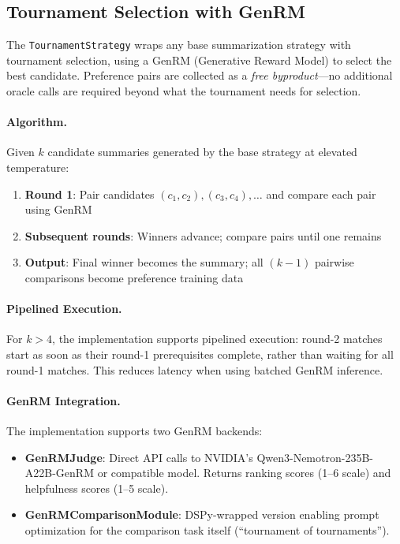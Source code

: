 
\subsection{Tournament Selection with GenRM}\label{sec:tournament-genrm}

The \texttt{TournamentStrategy} wraps any base summarization strategy with tournament selection, using a GenRM (Generative Reward Model) to select the best candidate. Preference pairs are collected as a \emph{free byproduct}---no additional oracle calls are required beyond what the tournament needs for selection.

\paragraph{Algorithm.}
Given $k$ candidate summaries generated by the base strategy at elevated temperature:

\begin{enumerate}[nosep]
    \item \textbf{Round 1}: Pair candidates $(c_1, c_2), (c_3, c_4), \ldots$ and compare each pair using GenRM
    \item \textbf{Subsequent rounds}: Winners advance; compare pairs until one remains
    \item \textbf{Output}: Final winner becomes the summary; all $(k-1)$ pairwise comparisons become preference training data
\end{enumerate}

\paragraph{Pipelined Execution.}
For $k > 4$, the implementation supports pipelined execution: round-2 matches start as soon as their round-1 prerequisites complete, rather than waiting for all round-1 matches. This reduces latency when using batched GenRM inference.

\paragraph{GenRM Integration.}
The implementation supports two GenRM backends:
\begin{itemize}[nosep]
    \item \textbf{GenRMJudge}: Direct API calls to NVIDIA's Qwen3-Nemotron-235B-A22B-GenRM or compatible model. Returns ranking scores (1--6 scale) and helpfulness scores (1--5 scale).
    \item \textbf{GenRMComparisonModule}: DSPy-wrapped version enabling prompt optimization for the comparison task itself (``tournament of tournaments'').
\end{itemize}

